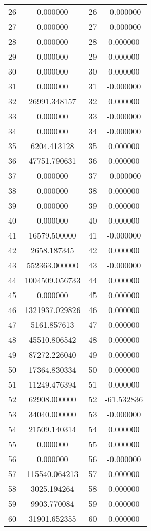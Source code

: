 \documentclass[12pt]{article}
\begin{document}
\begin{longtable}{@{}cccc@{}}
26 & 0.000000 & 26 & -0.000000 \\
27 & 0.000000 & 27 & -0.000000 \\
28 & 0.000000 & 28 & 0.000000 \\
29 & 0.000000 & 29 & 0.000000 \\
30 & 0.000000 & 30 & 0.000000 \\
31 & 0.000000 & 31 & -0.000000 \\
32 & 26991.348157 & 32 & 0.000000 \\
33 & 0.000000 & 33 & -0.000000 \\
34 & 0.000000 & 34 & -0.000000 \\
35 & 6204.413128 & 35 & 0.000000 \\
36 & 47751.790631 & 36 & 0.000000 \\
37 & 0.000000 & 37 & -0.000000 \\
38 & 0.000000 & 38 & 0.000000 \\
39 & 0.000000 & 39 & 0.000000 \\
40 & 0.000000 & 40 & 0.000000 \\
41 & 16579.500000 & 41 & -0.000000 \\
42 & 2658.187345 & 42 & 0.000000 \\
43 & 552363.000000 & 43 & -0.000000 \\
44 & 1004509.056733 & 44 & 0.000000 \\
45 & 0.000000 & 45 & 0.000000 \\
46 & 1321937.029826 & 46 & 0.000000 \\
47 & 5161.857613 & 47 & 0.000000 \\
48 & 45510.806542 & 48 & 0.000000 \\
49 & 87272.226040 & 49 & 0.000000 \\
50 & 17364.830334 & 50 & 0.000000 \\
51 & 11249.476394 & 51 & 0.000000 \\
52 & 62908.000000 & 52 & -61.532836 \\
53 & 34040.000000 & 53 & -0.000000 \\
54 & 21509.140314 & 54 & 0.000000 \\
55 & 0.000000 & 55 & 0.000000 \\
56 & 0.000000 & 56 & -0.000000 \\
57 & 115540.064213 & 57 & 0.000000 \\
58 & 3025.194264 & 58 & 0.000000 \\
59 & 9903.770084 & 59 & 0.000000 \\
60 & 31901.652355 & 60 & 0.000000 \\

\end{longtable}
\end{document}
